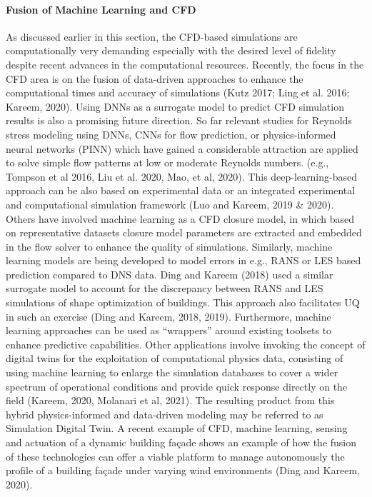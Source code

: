 \paragraph{Fusion of Machine Learning and CFD} As discussed earlier in this section, the CFD-based simulations are computationally very demanding especially with the desired level of fidelity despite recent advances in the computational resources. Recently, the focus in the CFD area is on the fusion of data-driven approaches to enhance the computational times and accuracy of simulations (Kutz 2017; Ling et al. 2016; Kareem, 2020). Using DNNs as a surrogate model to predict CFD simulation results is also a promising future direction. So far relevant studies for Reynolds stress modeling using DNNs, CNNs for flow prediction, or physics-informed neural networks (PINN) which have gained a considerable attraction are applied to solve simple flow patterns at low or moderate Reynolds numbers. (e.g., Tompson et al  2016, Liu et al. 2020, Mao, et al, 2020). This deep-learning-based approach can be also based on experimental data or an integrated experimental and computational simulation framework (Luo and Kareem, 2019 & 2020). Others have involved machine learning as a CFD closure model, in which based on representative datasets closure model parameters are extracted and embedded in the flow solver to enhance the quality of simulations. Similarly, machine learning models are being developed to model errors in e.g., RANS or LES based prediction compared to DNS data. Ding and Kareem (2018) used a similar surrogate model to account for the discrepancy between RANS and LES simulations of shape optimization of buildings. This approach also facilitates UQ in such an exercise (Ding and Kareem, 2018, 2019). Furthermore, machine learning approaches can be used as “wrappers” around existing toolsets to enhance predictive capabilities. Other applications involve invoking the concept of digital twins for the exploitation of computational physics data, consisting of using machine learning to enlarge the simulation databases to cover a wider spectrum of operational conditions and provide quick response directly on the field (Kareem, 2020, Molanari et al, 2021). The resulting product from this hybrid physics-informed and data-driven modeling may be referred to as Simulation Digital Twin. A recent example of CFD, machine learning, sensing and actuation of a dynamic building façade shows an example of how the fusion of these technologies can offer a viable platform to manage autonomously the profile of a building façade under varying wind environments (Ding and Kareem, 2020). 
